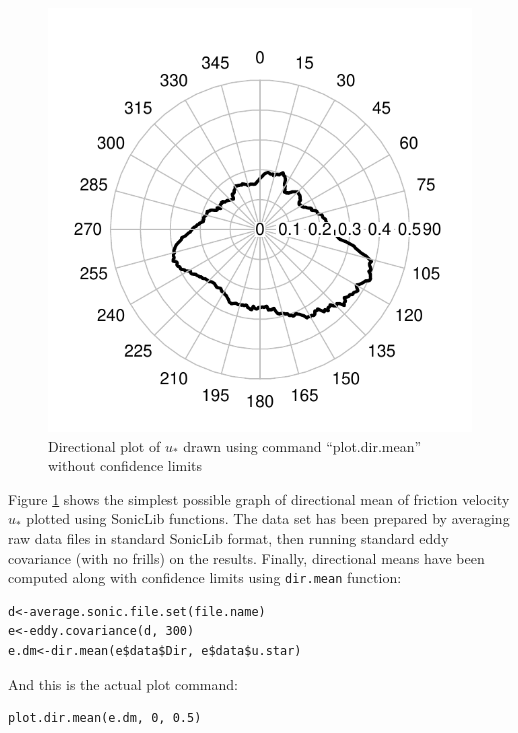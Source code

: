 \documentclass[a4paper,10pt]{book}
\begin{document}
\begin{figure}[htp]
 \centering
 \begin{center}
 \includegraphics[scale=1,keepaspectratio=true]{./diagrams/DirMeanUstar_1.pdf}
 \end{center}
 \caption{Directional plot of $u_{*}$ drawn using command ``plot.dir.mean'' without confidence limits}
 \label{fig:Directional plot 1}
\end{figure}

Figure \ref{fig:Directional plot 1} shows the simplest possible graph of directional mean of friction velocity $u_{*}$ plotted using SonicLib functions. The data set has been prepared by averaging raw data files in standard SonicLib format, then running standard eddy covariance (with no frills) on the results. Finally, directional means have been computed along with confidence limits using \verb|dir.mean| function:

\begin{verbatim}
d<-average.sonic.file.set(file.name)
e<-eddy.covariance(d, 300)
e.dm<-dir.mean(e$data$Dir, e$data$u.star)
\end{verbatim}

\noindent And this is the actual plot command:

\begin{verbatim}
plot.dir.mean(e.dm, 0, 0.5)
\end{verbatim}
\end{document}
